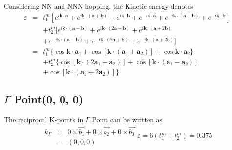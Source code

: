\documentclass[reprint, aps, prb, showkeys]{revtex4-2}
\begin{document}
Considering NN and NNN hopping, the Kinetic energy denotes 
\begin{eqnarray}
    \varepsilon&=&t_1^m [e^{i \boldsymbol{k} \cdot \boldsymbol{a}}+e^{i \boldsymbol{k} \cdot (\boldsymbol{a} + \boldsymbol{b}) }+e^{i \boldsymbol{k} \cdot \boldsymbol{b}} + e^{-i\boldsymbol{k} \cdot \boldsymbol{a}}+e^{-i \boldsymbol{k} \cdot (\boldsymbol{a} + \boldsymbol{b}) }+e^{-i \boldsymbol{k} \cdot \boldsymbol{b}}] \nonumber\\
    &&+t_2^m[e^{i \boldsymbol{k} \cdot (\boldsymbol{a} - \boldsymbol{b})}+e^{i \boldsymbol{k} \cdot (2\boldsymbol{a} + \boldsymbol{b})}+e^{i \boldsymbol{k} \cdot (\boldsymbol{a} + 2\boldsymbol{b})} \nonumber \\
    &&+ e^{-i \boldsymbol{k} \cdot (\boldsymbol{a} - \boldsymbol{b})}+e^{-i \boldsymbol{k} \cdot (2\boldsymbol{a} + \boldsymbol{b})}+e^{-i \boldsymbol{k} \cdot (\boldsymbol{a} + 2\boldsymbol{b})}] \nonumber\\
    &=& t_1^m \{ \cos{\boldsymbol{k} \cdot \boldsymbol{a}_1} + \cos{[\boldsymbol{k} \cdot (\boldsymbol{a}_1 + \boldsymbol{a}_2)]} + \cos{\boldsymbol{k} \cdot \boldsymbol{a}_2} \} \nonumber \\
    &&+ t_2^m \{ \cos{[\boldsymbol{k} \cdot (2\boldsymbol{a}_1 + \boldsymbol{a}_2)]} + \cos{[\boldsymbol{k} \cdot (\boldsymbol{a}_1 - \boldsymbol{a}_2)]} \nonumber \\
    &&+ \cos{[\boldsymbol{k} \cdot (\boldsymbol{a}_1 + 2\boldsymbol{a}_2)]} \}
\end{eqnarray}

\subsection{$\Gamma$ Point(0, 0, 0)}
The reciprocal K-points in $\Gamma$ Point can be written as
\begin{subequations}
\begin{eqnarray} 
    k_{\Gamma} &=& 0 \times \vec{b_1} + 0 \times \vec{b_2} + 0 \times \vec{b_3} \nonumber\\
    &=& (0, 0, 0)
\end{eqnarray}
\begin{equation}
    \varepsilon = 6(t_1^m + t_2^m) = 0.375
\end{equation}
\end{subequations}
\end{document}
